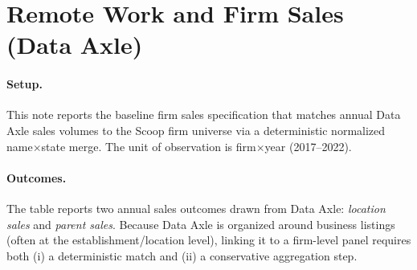 \documentclass{article}
\begin{document}
\thispagestyle{empty}

\section*{Remote Work and Firm Sales (Data Axle)}

\paragraph{Setup.}
This note reports the baseline firm sales specification that matches annual Data Axle sales volumes to the Scoop firm universe via a deterministic normalized name$\times$state merge. The unit of observation is firm$\times$year (2017--2022).

\paragraph{Outcomes.}
The table reports two annual sales outcomes drawn from Data Axle: \textit{location sales} and \textit{parent sales}. Because Data Axle is organized around business listings (often at the establishment/location level), linking it to a firm-level panel requires both (i) a deterministic match and (ii) a conservative aggregation step.
\end{document}
